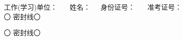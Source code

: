 \sbox{\zdxa}
{\parbox{27cm}{\centering \heiti \hspace{1cm}
		工作(学习)单位：\underline{\makebox[30mm][c]{}}~~~ 姓名：\underline{\makebox[20mm][c]{}}~~~身份证号：\underline{\makebox[30mm][c]{}}~~~ 准考证号：\underline{\makebox[30mm][c]{}} \\
		\vspace{1mm}
	  \dotfill{} 〇 \dotfill{} 密\dotfill{}封\dotfill{}线\dotfill{}〇\dotfill{} \\
}}
\newsavebox{\zdxb}%
\sbox{\zdxb}
{\parbox{27cm}{\centering \heiti
		\vspace{30mm}
		\vspace{1mm}
		\dotfill{} 〇 \dotfill{}密\dotfill{}封\dotfill{}线\dotfill{}〇\dotfill{} \\
}}

\newcommand{\putzdx}{
		\hspace{-1.7cm}\parbox{1cm}{\vspace{-1.5cm}
			\rotatebox[origin=c]{90}{
				\usebox{\zdxa}
		}}
}
\newcommand{\putzdxx}{
	\hspace{0.3cm}\parbox{1cm}{\vspace{-1.5cm}
		\rotatebox[origin=c]{-90}{
			\usebox{\zdxb}
	}}
}


\usepackage{ifthen}

\newlength{\la}
\newlength{\lb}
\newlength{\lc}
\newlength{\ld}
\newlength{\lee}
\newlength{\lf}
\newlength{\lhalf}
\newlength{\lquarter}
\newlength{\lmax}
\newcommand{\xx}[4]{\\[.5pt]%
	\settowidth{\la}{A、#1~~~}  
	\settowidth{\lb}{B、#2~~~}
	\settowidth{\lc}{C、#3~~~}  
	\settowidth{\ld}{D、#4~~~}  
	\ifthenelse{\lengthtest{\la > \lb}}
	{\setlength{\lmax}{\la}}{\setlength{\lmax}{\lb}}  
		\ifthenelse{\lengthtest{\lmax < \lc}}  {\setlength{\lmax}{\lc}}  {}  \ifthenelse{\lengthtest{\lmax < \ld}}  {\setlength{\lmax}{\ld}}  {} 
	    \setlength{\lhalf}{0.5\linewidth} 
	    \setlength{\lquarter}{0.25\linewidth}
	    \ifthenelse{\lengthtest{\lmax > \lhalf}}  
	    {\noindent{}A、#1 \\ B、#2 \\ C、#3 \\ D、#4 }  {  \ifthenelse{\lengthtest{\lmax > \lquarter}}  
	    	{\noindent
	    	 \makebox[\lhalf][l]{A、#1~~~}%
	    	 \makebox[\lhalf][l]{B、#2~~~}\\%
	    	 \makebox[\lhalf][l]{C、#3~~~}%
	    	 \makebox[\lhalf][l]{D、#4~~~}}%
    		 {\noindent\makebox[\lquarter][l]{A、#1~~~}%
    		 \makebox[\lquarter][l]{B、#2~~~}%
    		 \makebox[\lquarter][l]{C、#3~~~}%
    		 \makebox[\lquarter][l]{D、#4~~~}}
    	 }}
     
